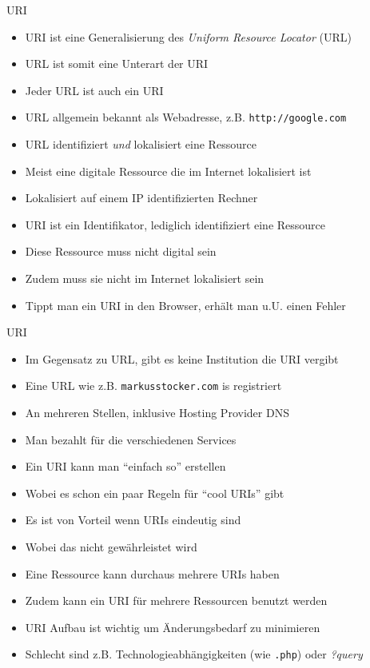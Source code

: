 \documentclass{beamer}
\begin{document}
\begin{frame}{URI}
	
	\begin{itemize}
		\item URI ist eine Generalisierung des \emph{Uniform Resource Locator} (URL)
		\item URL ist somit eine Unterart der URI
		\item Jeder URL ist auch ein URI
		\item URL allgemein bekannt als Webadresse, z.B. \texttt{http://google.com}
		\item URL identifiziert \emph{und} lokalisiert eine Ressource
		\item Meist eine digitale Ressource die im Internet lokalisiert ist
		\item Lokalisiert auf einem IP identifizierten Rechner
		\item URI ist ein Identifikator, lediglich identifiziert eine Ressource
		\item Diese Ressource muss nicht digital sein
		\item Zudem muss sie nicht im Internet lokalisiert sein
		\item Tippt man ein URI in den Browser, erhält man u.U. einen Fehler
	\end{itemize}
	
\end{frame}

\begin{frame}{URI}
	
	\begin{itemize}
		\item Im Gegensatz zu URL, gibt es keine Institution die URI vergibt
		\item Eine URL wie z.B. \texttt{markusstocker.com} is registriert
		\item An mehreren Stellen, inklusive Hosting Provider DNS
		\item Man bezahlt für die verschiedenen Services
		\item Ein URI kann man ``einfach so'' erstellen
		\item Wobei es schon ein paar Regeln für ``cool URIs'' gibt
		\item Es ist von Vorteil wenn URIs eindeutig sind
		\item Wobei das nicht gewährleistet wird
		\item Eine Ressource kann durchaus mehrere URIs haben
		\item Zudem kann ein URI für mehrere Ressourcen benutzt werden
		\item URI Aufbau ist wichtig um Änderungsbedarf zu minimieren
		\item Schlecht sind z.B. Technologieabhängigkeiten (wie \texttt{.php}) oder \emph{?query}
	\end{itemize}
	
\end{frame}
\end{document}
